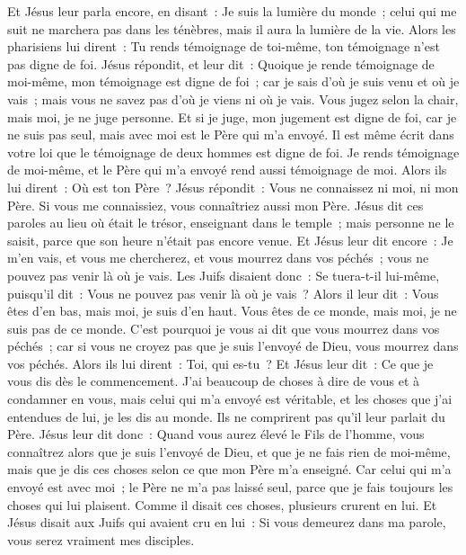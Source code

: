 \begin{multicols}{2}
Et Jésus leur parla encore, en disant~: Je suis la lumière du monde~; celui qui me suit ne marchera pas dans les ténèbres, mais il aura la lumière de la vie.
Alors les pharisiens lui dirent~: Tu rends témoignage de toi-même, ton témoignage n'est pas digne de foi.
Jésus répondit, et leur dit~: Quoique je rende témoignage de moi-même, mon témoignage est digne de foi~; car je sais d'où je suis venu et où je vais~; mais vous ne savez pas d'où je viens ni où je vais.
Vous jugez selon la chair, mais moi, je ne juge personne.
Et si je juge, mon jugement est digne de foi, car je ne suis pas seul, mais avec moi est le Père qui m'a envoyé.
Il est même écrit dans votre loi que le témoignage de deux hommes est digne de foi.
Je rends témoignage de moi-même, et le Père qui m'a envoyé rend aussi témoignage de moi.
Alors ils lui dirent~: Où est ton Père~? Jésus répondit~: Vous ne connaissez ni moi, ni mon Père. Si vous me connaissiez, vous connaîtriez aussi mon Père.
Jésus dit ces paroles au lieu où était le trésor, enseignant dans le temple~; mais personne ne le saisit, parce que son heure n'était pas encore venue.
Et Jésus leur dit encore~: Je m'en vais, et vous me chercherez, et vous mourrez dans vos péchés~; vous ne pouvez pas venir là où je vais.
Les Juifs disaient donc~: Se tuera-t-il lui-même, puisqu'il dit~: Vous ne pouvez pas venir là où je vais~?
Alors il leur dit~: Vous êtes d'en bas, mais moi, je suis d'en haut. Vous êtes de ce monde, mais moi, je ne suis pas de ce monde.
C'est pourquoi je vous ai dit que vous mourrez dans vos péchés~; car si vous ne croyez pas que je suis l'envoyé de Dieu, vous mourrez dans vos péchés.
Alors ils lui dirent~: Toi, qui es-tu~? Et Jésus leur dit~: Ce que je vous dis dès le commencement.
J'ai beaucoup de choses à dire de vous et à condamner en vous, mais celui qui m'a envoyé est véritable, et les choses que j'ai entendues de lui, je les dis au monde.
Ils ne comprirent pas qu'il leur parlait du Père.
Jésus leur dit donc~: Quand vous aurez élevé le Fils de l'homme, vous connaîtrez alors que je suis l'envoyé de Dieu, et que je ne fais rien de moi-même, mais que je dis ces choses selon ce que mon Père m'a enseigné.
Car celui qui m'a envoyé est avec moi~; le Père ne m'a pas laissé seul, parce que je fais toujours les choses qui lui plaisent.
Comme il disait ces choses, plusieurs crurent en lui.
Et Jésus disait aux Juifs qui avaient cru en lui~: Si vous demeurez dans ma parole, vous serez vraiment mes disciples.

\end{multicols}

